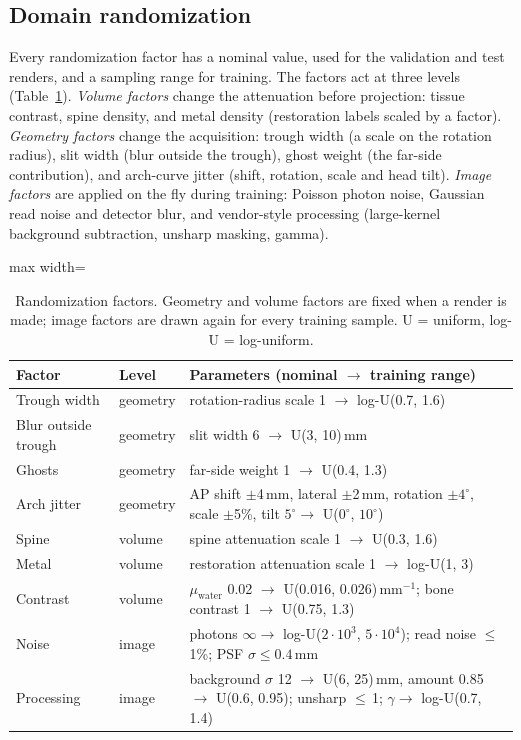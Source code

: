 \documentclass[preprint,12pt]{elsarticle}
\begin{document}
\subsection{Domain randomization}
Every randomization factor has a nominal value, used for the validation and test renders, and a sampling range for
training. The factors act at three levels (Table~\ref{tab:dr}). \emph{Volume factors} change the attenuation before
projection: tissue contrast, spine density, and metal density (restoration labels scaled by a factor). \emph{Geometry
factors} change the acquisition: trough width (a scale on the rotation radius), slit width (blur outside the trough),
ghost weight (the far-side contribution), and arch-curve jitter (shift, rotation, scale and head tilt). \emph{Image
factors} are applied on the fly during training: Poisson photon noise, Gaussian read noise and detector blur, and
vendor-style processing (large-kernel background subtraction, unsharp masking, gamma).

\begin{table}[t]
\centering\small
\caption{Randomization factors. Geometry and volume factors are fixed when a render is made; image factors are drawn
again for every training sample. U = uniform, log-U = log-uniform.}
\label{tab:dr}
\begin{adjustbox}{max width=\linewidth}
\begin{tabular}{@{}llp{9.2cm}@{}}
\toprule
Factor & Level & Parameters (nominal $\to$ training range) \\
\midrule
Trough width & geometry & rotation-radius scale 1 $\to$ log-U(0.7, 1.6) \\
Blur outside trough & geometry & slit width 6 $\to$ U(3, 10)\,mm \\
Ghosts & geometry & far-side weight 1 $\to$ U(0.4, 1.3) \\
Arch jitter & geometry & AP shift $\pm$4\,mm, lateral $\pm$2\,mm, rotation $\pm4^\circ$, scale $\pm$5\%, tilt
$5^\circ \to$ U($0^\circ$, $10^\circ$) \\
Spine & volume & spine attenuation scale 1 $\to$ U(0.3, 1.6) \\
Metal & volume & restoration attenuation scale 1 $\to$ log-U(1, 3) \\
Contrast & volume & $\mu_\mathrm{water}$ 0.02 $\to$ U(0.016, 0.026)\,mm$^{-1}$; bone contrast 1 $\to$ U(0.75, 1.3) \\
Noise & image & photons $\infty \to$ log-U($2\cdot10^3$, $5\cdot10^4$); read noise $\leq$\,1\%; PSF
$\sigma \leq 0.4$\,mm \\
Processing & image & background $\sigma$ 12 $\to$ U(6, 25)\,mm, amount 0.85 $\to$ U(0.6, 0.95); unsharp $\leq$\,1;
$\gamma \to$ log-U(0.7, 1.4) \\
\bottomrule
\end{tabular}
\end{adjustbox}
\end{table}
\end{document}
